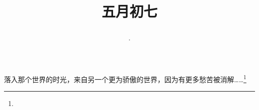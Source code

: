 \title{\date[d=12,m=6,y=2024][year:cn-y,年,month:cn,day:cn,日,·,weekday]·五月初七 }
落入那个世界的时光，来自另一个更为骄傲的世界，因为有更多愁苦被消解……\footnote{ }

